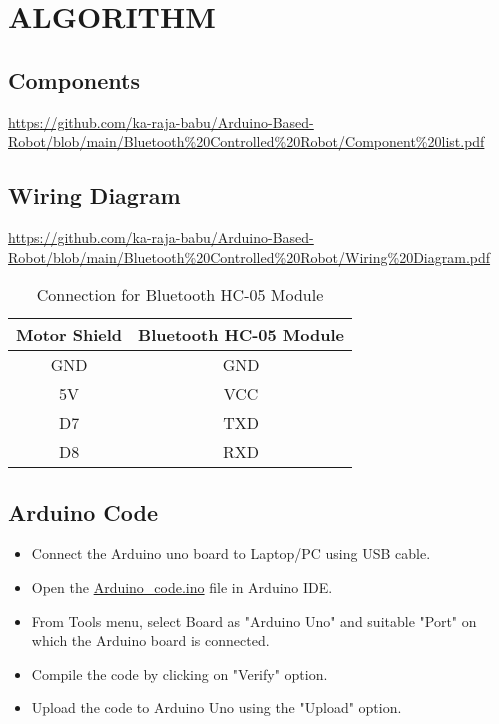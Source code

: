 \documentclass[journal,12pt,twocolumn]{IEEEtran}
\begin{document}
\section{ALGORITHM}
\subsection{\textbf{Components}}
\url{https://github.com/ka-raja-babu/Arduino-Based-Robot/blob/main/Bluetooth%20Controlled%20Robot/Component%20list.pdf}
\subsection{\textbf{Wiring Diagram}}
\url{https://github.com/ka-raja-babu/Arduino-Based-Robot/blob/main/Bluetooth%20Controlled%20Robot/Wiring%20Diagram.pdf}

\begin{table}[!ht]
\centering
\begin{tabular}{|c|c|} 
\hline
Motor Shield & Bluetooth HC-05 Module \\
\hline
GND & GND \\ 
\hline
5V & VCC \\ 
\hline
D7 & TXD \\ 
\hline
D8 & RXD \\
\hline
\end{tabular}
\caption{Connection for Bluetooth HC-05 Module}
\label{tab:table1}
\end{table}

\subsection{\textbf{Arduino Code}}
\begin{itemize}
    \item Connect the Arduino uno board to Laptop/PC using USB cable.
    \item Open the \href{https://github.com/ka-raja-babu/Arduino-Based-Robot/blob/main/Bluetooth%20Controlled%20Robot/Code.ino}{Arduino\_code.ino} file in Arduino IDE. 
    \item From Tools menu, select Board as "Arduino Uno" and suitable "Port" on which the Arduino board is connected.
    \item Compile the code by clicking on "Verify" option.
    \item Upload the code to Arduino Uno using the "Upload" option.
\end{itemize}
\end{document}
